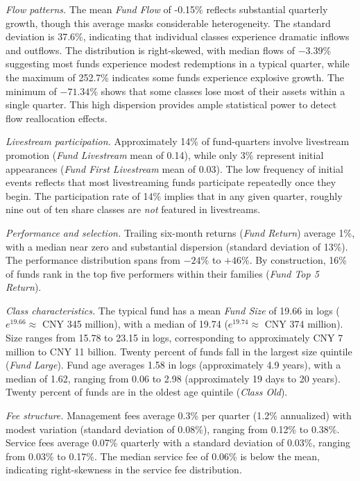 \documentclass[12pt]{article}
\begin{document}
\textit{Flow patterns.} The mean \textit{Fund Flow} of -0.15\% reflects substantial quarterly growth, though this average masks considerable heterogeneity. The standard deviation is 37.6\%, indicating that individual classes experience dramatic inflows and outflows. The distribution is right-skewed, with median flows of $-3.39\%$ suggesting most funds experience modest redemptions in a typical quarter, while the maximum of 252.7\% indicates some funds experience explosive growth. The minimum of $-71.34\%$ shows that some classes lose most of their assets within a single quarter. This high dispersion provides ample statistical power to detect flow reallocation effects.

\textit{Livestream participation.} Approximately 14\% of fund-quarters involve livestream promotion (\textit{Fund Livestream} mean of 0.14), while only 3\% represent initial appearances (\textit{Fund First Livestream} mean of 0.03). The low frequency of initial events reflects that most livestreaming funds participate repeatedly once they begin. The participation rate of 14\% implies that in any given quarter, roughly nine out of ten share classes are \emph{not} featured in livestreams.

\textit{Performance and selection.} Trailing six-month returns (\textit{Fund Return}) average 1\%, with a median near zero and substantial dispersion (standard deviation of 13\%). The performance distribution spans from $-24\%$ to $+46\%$. By construction, 16\% of funds rank in the top five performers within their families (\textit{Fund Top 5 Return}).

\textit{Class characteristics.} The typical fund has a mean \textit{Fund Size} of 19.66 in logs ($e^{19.66} \approx$ CNY 345 million), with a median of 19.74 ($e^{19.74} \approx$ CNY 374 million). Size ranges from 15.78 to 23.15 in logs, corresponding to approximately CNY 7 million to CNY 11 billion. Twenty percent of funds fall in the largest size quintile (\textit{Fund Large}). Fund age averages 1.58 in logs (approximately 4.9 years), with a median of 1.62, ranging from 0.06 to 2.98 (approximately 19 days to 20 years). Twenty percent of funds are in the oldest age quintile (\textit{Class Old}).

\textit{Fee structure.} Management fees average 0.3\% per quarter (1.2\% annualized) with modest variation (standard deviation of 0.08\%), ranging from 0.12\% to 0.38\%. Service fees average 0.07\% quarterly with a standard deviation of 0.03\%, ranging from 0.03\% to 0.17\%. The median service fee of 0.06\% is below the mean, indicating right-skewness in the service fee distribution.
\end{document}
